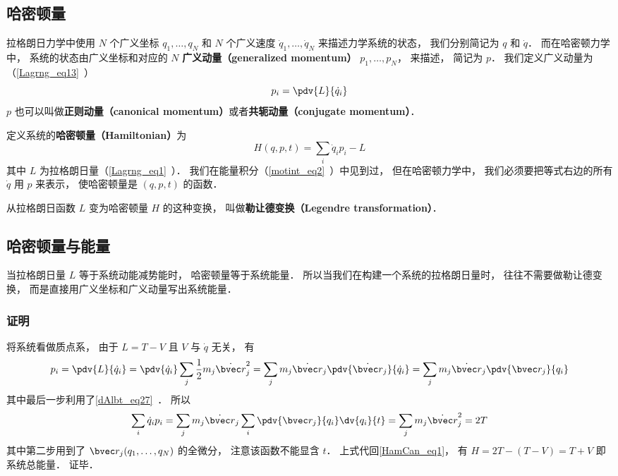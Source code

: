 

\subsection{哈密顿量}
拉格朗日力学中使用 $N$ 个广义坐标 $q_1,\dots,q_N$ 和 $N$ 个广义速度 $\dot q_1,\dots,\dot q_N$ 来描述力学系统的状态， 我们分别简记为 $q$ 和 $\dot q$． 而在哈密顿力学中， 系统的状态由广义坐标和对应的 $N$ \textbf{广义动量（generalized momentum）} $p_1, \dots, p_N$， 来描述， 简记为 $p$． 我们定义广义动量为（\autoref{Lagrng_eq13}~）
\begin{equation}
p_i = \pdv{L}{\dot q_i}
\end{equation}
$p$ 也可以叫做\textbf{正则动量（canonical momentum）}或者\textbf{共轭动量（conjugate momentum）}．

定义系统的\textbf{哈密顿量（Hamiltonian）}为
\begin{equation}\label{HamCan_eq1}
H(q,p,t) = \sum_i \dot q_i p_i - L
\end{equation}
其中 $L$ 为拉格朗日量（\autoref{Lagrng_eq1}~）． 我们在能量积分（\autoref{motint_eq2}~）中见到过， 但在哈密顿力学中， 我们必须要把等式右边的所有 $\dot q$ 用 $p$ 来表示， 使哈密顿量是 $(q,p,t)$ 的函数．

从拉格朗日函数 $L$ 变为哈密顿量 $H$ 的这种变换， 叫做\textbf{勒让德变换（Legendre transformation）}．

\subsection{哈密顿量与能量}
当拉格朗日量 $L$ 等于系统动能减势能时， 哈密顿量等于系统能量． 所以当我们在构建一个系统的拉格朗日量时， 往往不需要做勒让德变换， 而是直接用广义坐标和广义动量写出系统能量．

\subsubsection{证明}
将系统看做质点系， 由于 $L = T - V$ 且 $V$ 与 $\dot q$ 无关， 有
\begin{equation}
p_i = \pdv{L}{\dot q_i} = \pdv{\dot q_i} \sum_j \frac12 m_j \dot{\bvec r}_j^2
= \sum_j m_j \dot{\bvec r}_j \pdv{\dot{\bvec r}_j}{\dot q_i}
= \sum_j m_j \dot{\bvec r}_j  \pdv{\bvec r_j}{q_i}
\end{equation}
其中最后一步利用了\autoref{dAlbt_eq27}~． 所以
\begin{equation}
 \sum_i \dot q_i p_i = \sum_j m_j \dot{\bvec r}_j \sum_i \pdv{\bvec r_j}{q_i}\dv{q_i}{t}
= \sum_j m_j \dot{\bvec r}_j^2 = 2T
\end{equation}
其中第二步用到了 $\bvec r_j(q_1,\dots,q_N)$ 的全微分， 注意该函数不能显含 $t$．%
上式代回\autoref{HamCan_eq1}， 有 $H = 2T - (T - V) = T + V$ 即系统总能量． 证毕．

